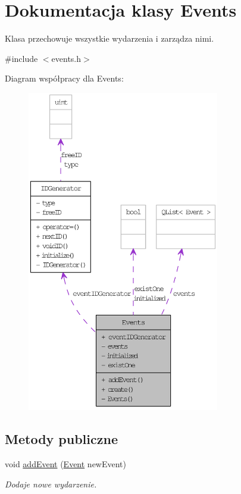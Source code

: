 \hypertarget{classEvents}{
\section{Dokumentacja klasy Events}
\label{classEvents}
}


Klasa przechowuje wszystkie wydarzenia i zarządza nimi.  




{\ttfamily \#include $<$events.h$>$}



Diagram współpracy dla Events:\nopagebreak
\begin{figure}[H]
\begin{center}
\leavevmode
\includegraphics[height=400pt]{classEvents__coll__graph}
\end{center}
\end{figure}
\subsection*{Metody publiczne}
\begin{DoxyCompactItemize}
\item 
void \hyperlink{classEvents_afb346fb0339e89dd2093dec8f0620da7}{addEvent} (\hyperlink{classEvent}{Event} newEvent)
\begin{DoxyCompactList}\small\item\em Dodaje nowe wydarzenie. \item\end{DoxyCompactList}\end{DoxyCompactItemize}
